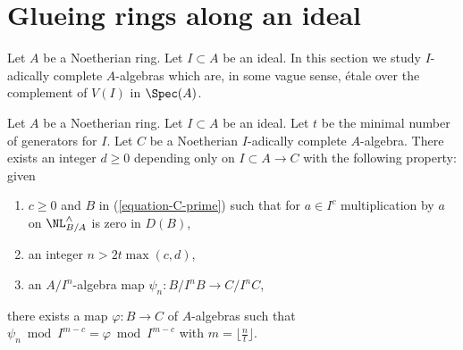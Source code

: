 \section{Glueing rings along an ideal}
\label{section-approximation}

\noindent
Let $A$ be a Noetherian ring. Let $I \subset A$ be an ideal.
In this section we study $I$-adically complete $A$-algebras
which are, in some vague sense, \'etale over the complement of
$V(I)$ in $\Spec(A)$.

\begin{lemma}
\label{lemma-get-morphism-general}
Let $A$ be a Noetherian ring. Let $I \subset A$ be an ideal.
Let $t$ be the minimal number of generators for $I$.
Let $C$ be a Noetherian $I$-adically complete $A$-algebra.
There exists an integer $d \geq 0$ depending only on
$I \subset A \to C$ with the following property: given
\begin{enumerate}
\item $c \geq 0$ and $B$ in (\ref{equation-C-prime}) such that for $a \in I^c$
multiplication by $a$ on $\NL_{B/A}^\wedge$ is zero in $D(B)$,
\item an integer $n > 2t\max(c, d)$,
\item an $A/I^n$-algebra map $\psi_n : B/I^nB \to C/I^nC$,
\end{enumerate}
there exists a map $\varphi : B \to C$ of $A$-algebras such
that $\psi_n \bmod I^{m - c} = \varphi \bmod I^{m - c}$
with $m = \lfloor \frac{n}{t} \rfloor$.
\end{lemma}

